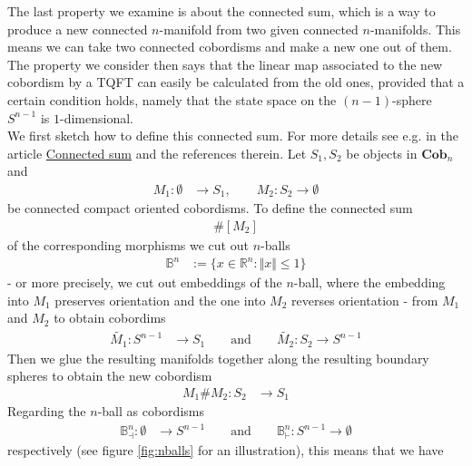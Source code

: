 \nocite{0a816f4c}
The last property we examine is about the connected sum, which is a way to produce a new connected $n$-manifold from two given connected $n$-manifolds. This means we can take two connected cobordisms and make a new one out of them. The property we consider then says that the linear map associated to the new cobordism by a TQFT can easily be calculated from the old ones, provided that a certain condition holds, namely that the state space on the $(n - 1)$-sphere $S^{n-1}$ is $1$-dimensional.
\\
We first sketch how to define this connected sum. For more details see e.g. \cite{wiki-map00000} in the article \href{http://www.map.mpim-bonn.mpg.de/Connected_sum}{Connected sum} and the references therein. Let $S_{1},S_{2}$ be objects in $\mathbf{Cob}_{n}$ and
\begin{align*}
  M_{1}
  \colon
  \emptyset
  &\to
  S_{1}
  ,\qquad
  M_{2}
  \colon
  S_{2}
  \to
  \emptyset
\end{align*}
be connected compact oriented cobordisms. To define the connected sum
\begin{align*}
  [M_{1}]
  \#
  [M_{2}]
\end{align*}
of the corresponding morphisms we cut out $n$-balls
\begin{align*}
  \mathbb{B}^{n}
  &:=
  \lbrace
    x
    \in
    \mathbb{R}^{n}
    \colon
    \Vert
    x
    \Vert
    \leq
    1
  \rbrace
\end{align*}
- or more precisely, we cut out embeddings of the $n$-ball, where the embedding into $M_{1}$ preserves orientation and the one into $M_{2}$ reverses orientation - from $M_{1}$ and $M_{2}$ to obtain cobordims
\begin{align*}
  \tilde{M_{1}}
  \colon
  S^{n-1}
  &\to
  S_{1}
  \qquad
  \text{and}
  \qquad
  \tilde{M_{2}}
  \colon
  S_{2}
  \to
  S^{n-1}
\end{align*}
Then we glue the resulting manifolds together along the resulting boundary spheres to obtain the new cobordism
\begin{align*}
  M_{1}
  \#
  M_{2}
  \colon 
  S_{2}
  &\to
  S_{1}
\end{align*}
Regarding the $n$-ball as cobordisms
\begin{align*}
  \mathbb{B}_{\dashv}^{n}
  \colon
  \emptyset
  &\to
  S^{n-1}
  \qquad
  \text{and}
  \qquad
  \mathbb{B}_{\vdash}^{n}
  \colon
  S^{n-1}
  \to
  \emptyset
\end{align*}
respectively (see figure \ref{fig:nballs} for an illustration), this means that we have
